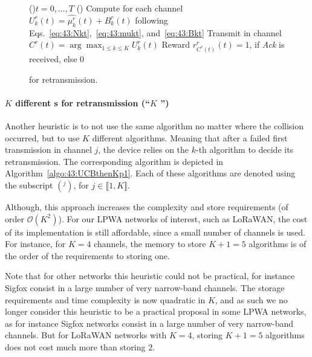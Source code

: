 \vspace*{-3pt}
\begin{figure}[h!]
	\centering
	\begin{algorithm}[H]
		\For(){$t = 0, \dots, T$}{
			\Else(){
				Compute for each channel $U^r_k(t) = \widehat{\mu^r_k}(t) + B^r_k(t)$ following Eqs.~\eqref{eq:43:Nkt},~\eqref{eq:43:mukt}, and~\eqref{eq:43:Bkt}\;
				Transmit in channel $C^r(t) = \arg\max_{1\leq k \leq K} U^r_k(t)$\;
				Reward $r^r_{C^r(t)}(t) = 1$, if \emph{Ack} is received, else $0$\;
			}
		}
		\caption{\UCB{} for retransmission.}    %
		\label{algo:43:TwoUCB}
		\end{algorithm}
\end{figure}

\paragraph{$K$ different {\UCB}s for retransmission (``$K$ \UCB{}'')}\label{sub:43:UCBthenKp1}

Another heuristic is to not use the same algorithm no matter where the collision occurred, but to use $K$ different \UCB{} algorithms.
Meaning that after a failed first transmission in channel $j$, the device relies on the $k$-th algorithm to decide its retransmission.
The corresponding algorithm is depicted in Algorithm~\ref{algo:43:UCBthenKp1}.
Each of these algorithms are denoted using the subscript $({}^{j})$, for $j\in\llbracket 1, K \rrbracket$.

Although, this approach increases the complexity and store requirements (of order $\mathcal{O}(K^2)$).
For our LPWA networks of interest, such as LoRaWAN, the cost of its implementation is still affordable, since a small number of channels is used.
For instance, for $K=4$ channels,
the memory to store $K+1=5$ algorithms is of the order of the requirements to storing one.

Note that for other networks this heuristic could not be practical, for instance Sigfox consist in a large number of very narrow-band channels.
The storage requirements and time complexity is now quadratic in $K$, and as such we no longer consider this heuristic to be a practical proposal in some LPWA networks, as for instance Sigfox networks consist in a large number of very narrow-band channels. But for LoRaWAN networks with $K=4$, storing $K+1=5$ algorithms does not cost much more than storing $2$.

